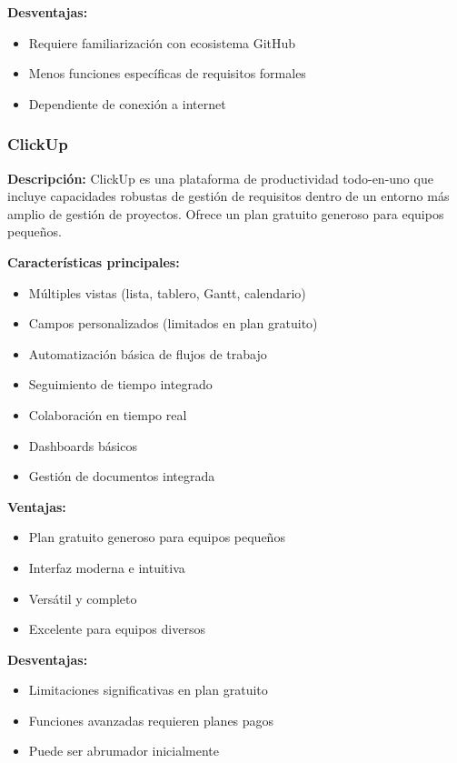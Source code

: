 \documentclass[12pt,a4paper]{article}
\begin{document}
\textbf{Desventajas:}
\begin{itemize}
    \item Requiere familiarización con ecosistema GitHub
    \item Menos funciones específicas de requisitos formales
    \item Dependiente de conexión a internet
\end{itemize}

\subsubsection{ClickUp}

\textbf{Descripción:}
ClickUp es una plataforma de productividad todo-en-uno que incluye capacidades robustas de gestión de requisitos dentro de un entorno más amplio de gestión de proyectos. Ofrece un plan gratuito generoso para equipos pequeños.

\textbf{Características principales:}
\begin{itemize}
    \item Múltiples vistas (lista, tablero, Gantt, calendario)
    \item Campos personalizados (limitados en plan gratuito)
    \item Automatización básica de flujos de trabajo
    \item Seguimiento de tiempo integrado
    \item Colaboración en tiempo real
    \item Dashboards básicos
    \item Gestión de documentos integrada
\end{itemize}

\textbf{Ventajas:}
\begin{itemize}
    \item Plan gratuito generoso para equipos pequeños
    \item Interfaz moderna e intuitiva
    \item Versátil y completo
    \item Excelente para equipos diversos
\end{itemize}

\textbf{Desventajas:}
\begin{itemize}
    \item Limitaciones significativas en plan gratuito
    \item Funciones avanzadas requieren planes pagos
    \item Puede ser abrumador inicialmente
\end{itemize}
\end{document}
